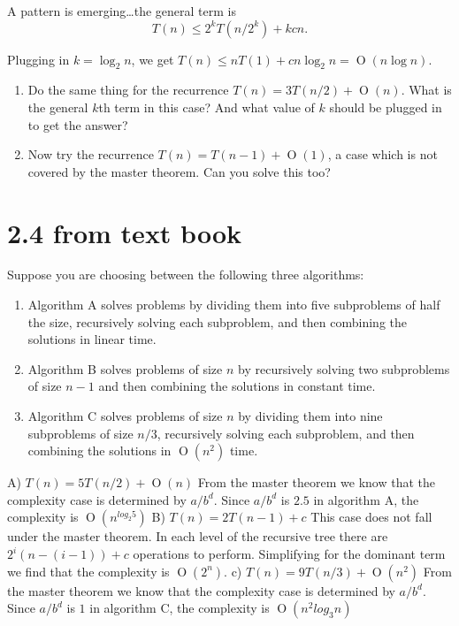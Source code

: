 \documentclass[12pt]{article}
\newcommand{\BigO}[1]{\ensuremath{\operatorname{O}\left(#1\right)}}
\begin{document}
A pattern is emerging\ldots the general term is 
\[T(n) \leq 2^kT(n/2^k) + kcn.\]

Plugging in $k = \log_2{n}$, we get $T(n) \leq nT(1) + cn\log_2{n} = \BigO{n\log{n}}.$
\begin{enumerate}
\item Do the same thing for the recurrence $T(n) = 3T(n/2) + \BigO{n}$. What
is the general $k$th term
in this case? And what value of $k$ should be plugged in to get the
answer?

\item Now try the recurrence $T(n) = T( n −1 ) + \BigO{1}$, a case which is not
covered by the master theorem. Can you solve this too?
\end{enumerate}

\section*{2.4 from text book}
Suppose you are choosing between the following three algorithms:

\begin{enumerate}
\item Algorithm A solves problems by dividing them into five subproblems
of half the size, recursively solving each subproblem, and then
combining the solutions in linear time.

\item Algorithm B solves problems of size $n$ by recursively solving two
subproblems of size $n−1$ and then combining the solutions in constant
time.

\item Algorithm C solves problems of size $n$ by dividing them into nine
subproblems of size $n/3$, recursively solving each subproblem, and then
combining the solutions in $\BigO{n^2}$ time.
\end{enumerate}

A) $T(n) = 5T(n/2) + \BigO{n}$
	From the master theorem we know that the complexity case is determined by $a/b^{d}$.  Since $a/b^{d}$ is $2.5$ in algorithm A, the complexity is $\BigO{n^{log_2 5}}$
B) $T(n) = 2T(n-1) + c$
	This case does not fall under the master theorem.  In each level of the	recursive tree there are $2^{i}(n-(i-1)) +c$ operations to perform.  Simplifying for the dominant term we find that the complexity is $\BigO{2^{n}}$.
c) $T(n) = 9T(n/3) + \BigO{n^2}$
	From the master theorem we know that the complexity case is determined by $a/b^{d}$.  Since $a/b^{d}$ is $1$ in algorithm C, the complexity is $\BigO{n^{2}log_3 n}$
\end{document}
